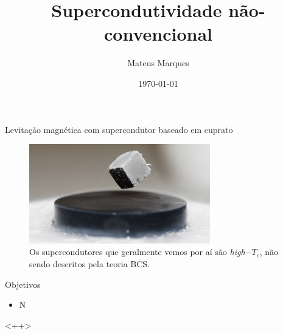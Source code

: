 \documentclass[aspectratio=169,xcolor={table,dvipsnames,usenames}]{beamer}
\title[Supercondutividade não-convencional]{\LARGE{Supercondutividade não-convencional}}
\author[Mateus Marques]{
\large{Mateus Marques
}}
\date{\today}
\begin{document}
\begin{frame}
  \titlepage
\end{frame}

\begin{frame}{Levitação magnética com supercondutor baseado em cuprato}

\begin{figure}[H]
\centering
\includegraphics[width=0.7\textwidth]{fig/levitating.jpg}
\caption{Os supercondutores que geralmente vemos por aí são \textit{high}$-T_c$, não sendo descritos pela teoria BCS.}
\label{fig:levitating}
\end{figure}

\end{frame}

\begin{frame}{Objetivos}

\begin{itemize}
\item N
\end{itemize}
<++>

\end{frame}
\end{document}
